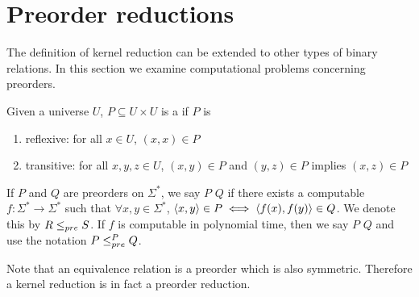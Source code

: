 \section{Preorder reductions}

The definition of kernel reduction can be extended to other types of binary relations.
In this section we examine computational problems concerning preorders.

Given a universe $U$, $P\subseteq U\times U$ is a  if $P$ is
\begin{enumerate}
\item reflexive: for all $x\in U$, $(x,x)\in P$
\item transitive: for all $x,y,z\in U$, $(x,y)\in P$ and $(y,z)\in P$ implies $(x,z)\in P$
\end{enumerate}

If $P$ and $Q$ are preorders on $\Sigma^*$, we say $P$  $Q$ if there exists a computable $f\colon\Sigma^*\to\Sigma^*$ such that $\forall x,y\in\Sigma^*$, $\langle x,y\rangle\in P\iff \langle f(x),f(y)\rangle\in Q$.
We denote this by $R\leq_{pre} S$.
If $f$ is computable in polynomial time, then we say $P$  $Q$ and use the notation $P\leq^{P}_{pre} Q$.

Note that an equivalence relation is a preorder which is also symmetric.
Therefore a kernel reduction is in fact a preorder reduction.

